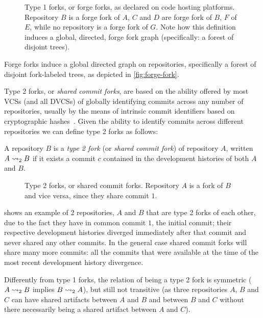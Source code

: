 \begin{figure}[t]
  \centering
  
  \caption{Type 1 forks, or forge forks, as declared on code hosting platforms.
    Repository $B$ is a forge fork of $A$, $C$ and $D$ are forge fork of $B$,
    $F$ of $E$, while no repository is a forge fork of $G$. Note how this
    definition induces a global, directed, forge fork graph (specifically: a
    forest of disjoint trees).
    }%
  \label{fig:forge-fork}%
  \label{fig:type1-fork}
\end{figure}

Forge forks induce a global directed graph on repositories, specifically a
forest of disjoint fork-labeled trees, as depicted in \cref{fig:forge-fork}.

Type 2 forks, or \emph{shared commit forks}, are based on the ability offered
by most \glspl{VCS} (and all \glspl{DVCS}) of globally identifying commits
across any number of repositories, usually by the means of intrinsic commit
identifiers based on cryptographic hashes~\cite{spinellis2005vcs,
  swhipres2018}. Given the ability to identify commits across different
repositories we can define type 2 forks as follows:
\begin{definition}%
  \label{def:commit-fork}%
  \label{def:type2-fork}
  A repository $B$ is a \emph{type 2 fork} (or \emph{shared commit fork}) of
  repository $A$, written $A\rightsquigarrow_2 B$ if it exists a commit $c$ contained in
  the development histories of both $A$ and $B$.
\end{definition}

\begin{figure}[t]
  \centering
  
  \caption{Type 2 forks, or shared commit forks. Repository $A$ is a fork of
    $B$ and vice versa, since they share commit $1$.}%
  \label{fig:commit-fork}%
  \label{fig:type2-fork}
\end{figure}

 shows an example of 2 repositories, $A$ and $B$ that
are type 2 forks of each other, due to the fact they have in common commit $1$,
the initial commit; their respective development histories diverged immediately
after that commit and never shared any other commits. In the general case
shared commit forks will share many more commits: all the commits that were
available at the time of the most recent development history divergence.

Differently from type 1 forks, the relation of being a type 2 fork is
symmetric ($A\rightsquigarrow_2 B$ implies $B\rightsquigarrow_2 A$), but still not transitive (as
three repositories $A$, $B$ and $C$ can have shared artifacts between $A$ and
$B$ and between $B$ and $C$ without there necessarily being a shared artifact
between $A$ and $C$).

